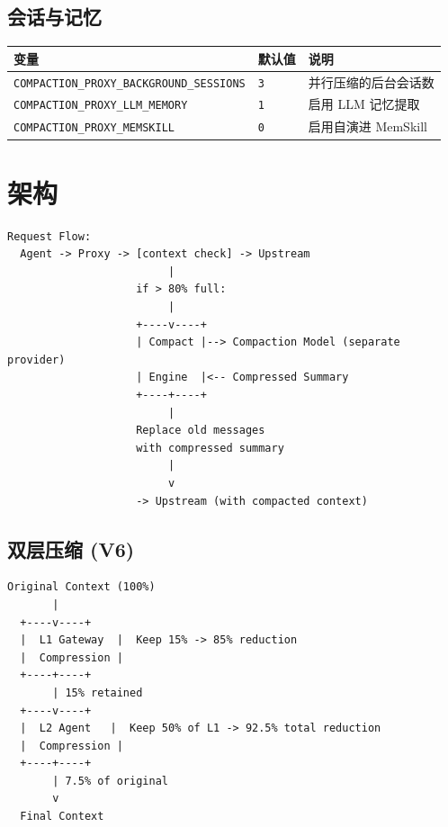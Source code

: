\documentclass[11pt,a4paper]{article}
\begin{document}
\subsection{会话与记忆}

\begin{longtable}{@{}llp{7cm}@{}}
  \toprule
  变量 & 默认值 & 说明 \\
  \midrule
  \texttt{COMPACTION\_PROXY\_BACKGROUND\_SESSIONS} & \texttt{3} & 并行压缩的后台会话数 \\
  \texttt{COMPACTION\_PROXY\_LLM\_MEMORY} & \texttt{1} & 启用 LLM 记忆提取 \\
  \texttt{COMPACTION\_PROXY\_MEMSKILL} & \texttt{0} & 启用自演进 MemSkill \\
  \bottomrule
\end{longtable}

\section{架构}

\begin{verbatim}
Request Flow:
  Agent -> Proxy -> [context check] -> Upstream
                         |
                    if > 80% full:
                         |
                    +----v----+
                    | Compact |--> Compaction Model (separate provider)
                    | Engine  |<-- Compressed Summary
                    +----+----+
                         |
                    Replace old messages
                    with compressed summary
                         |
                         v
                    -> Upstream (with compacted context)
\end{verbatim}

\subsection{双层压缩 (V6)}

\begin{verbatim}
Original Context (100%)
       |
  +----v----+
  |  L1 Gateway  |  Keep 15% -> 85% reduction
  |  Compression |
  +----+----+
       | 15% retained
  +----v----+
  |  L2 Agent   |  Keep 50% of L1 -> 92.5% total reduction
  |  Compression |
  +----+----+
       | 7.5% of original
       v
  Final Context
\end{verbatim}
\end{document}
